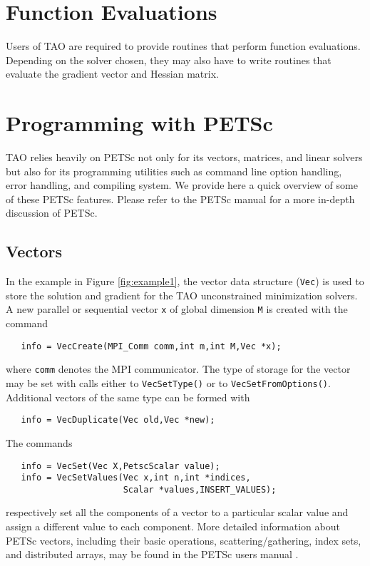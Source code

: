 \section{Function Evaluations}

Users of TAO are required to provide routines that perform function
evaluations. Depending on the solver chosen, they may also have to
write routines that evaluate the gradient vector and Hessian matrix.

\section{Programming with PETSc}
\label{sec:tao_programming}
TAO relies heavily on PETSc not only for its vectors, matrices, and linear
solvers but also for its programming utilities such as command line option 
handling, error handling, and compiling system.  We provide here a quick 
overview of some of these PETSc features.  Please refer to the PETSc 
manual \cite{petsc-user-ref} for a more in-depth
discussion of PETSc.

\subsection*{Vectors}

In the example in Figure \ref{fig:example1}, the vector data structure
(\texttt{Vec}) is used to store the solution and gradient for the TAO
unconstrained minimization solvers.  A new parallel or sequential
vector \texttt{x} of global dimension \texttt{M} is created with the
command 
\begin{verbatim}
   info = VecCreate(MPI_Comm comm,int m,int M,Vec *x);
\end{verbatim}
\noindent
where \texttt{comm} denotes the MPI communicator. The type of storage
for the vector may be set with calls either to \texttt{VecSetType()}
or to \texttt{VecSetFromOptions()}.  Additional vectors of the same type
can be formed with 
\begin{verbatim}
   info = VecDuplicate(Vec old,Vec *new);
\end{verbatim}
\noindent
The commands
\begin{verbatim}
   info = VecSet(Vec X,PetscScalar value);
   info = VecSetValues(Vec x,int n,int *indices,
                       Scalar *values,INSERT_VALUES);
\end{verbatim}
\noindent
respectively set all the components of a vector to a particular scalar
value and assign a different value to each component.  More detailed
information about PETSc vectors, including their basic operations,
scattering/gathering, index sets, and distributed arrays, may be found
in the PETSc users manual \cite{petsc-user-ref}.


